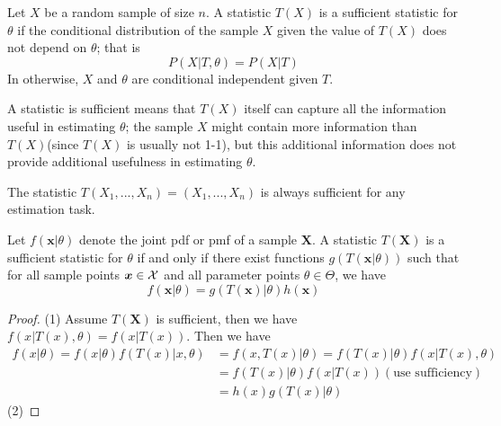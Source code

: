 \begin{refsection}
\begin{definition}
	Let $X$ be a random sample of size $n$. A statistic $T(X)$ is a sufficient statistic for $\theta$ if the conditional distribution of the sample $X$ given the value of $T(X)$ does not depend on $\theta$; that is
	$$P(X|T,\theta) = P(X|T)$$
	In otherwise, $X$ and $\theta$ are conditional independent given $T$.
\end{definition}



\begin{remark}
	A statistic is sufficient means that $T(X)$ itself can capture all the information useful in estimating $\theta$; the sample $X$ might contain more information than $T(X)$(since $T(X)$ is usually not 1-1), but this additional information does not provide additional usefulness in estimating $\theta$.
\end{remark}

\begin{remark}
	The statistic $T(X_1,...,X_n)=(X_1,...,X_n)$ is always sufficient for any estimation task.
\end{remark}


\begin{theorem}
	\cite[276]{casella2002statistical} Let $f(\bm{x}|\theta)$ denote the joint pdf or pmf of a sample $\bm{X}$. A statistic $T(\bm{X})$ is a sufficient statistic for $\theta$ if and only if there exist functions $g(T(\bm{x}|\theta))$ such that for all sample points $\bm{x}\in \mathcal{X}$ and all parameter points $\theta \in\Theta$, we have
	$$f(\bm{x}|\theta) = g(T(\bm{x})|\theta)h(\bm{x})$$
\end{theorem}
\begin{proof}
	(1) Assume $T(\bm{X})$ is sufficient, then we have $f(x|T(x),\theta) = f(x|T(x))$. Then we have
	\begin{align*}
	f(x|\theta) = f(x|\theta) f(T(x)|x,\theta) &= f(x,T(x)|\theta) = f(T(x)|\theta) f(x|T(x),\theta)\\
	&= f(T(x)|\theta)f(x|T(x)) (\text{use sufficiency})\\
	&=h(x) g(T(x)|\theta)
	\end{align*}
	(2)	
	

\end{proof}
\end{refsection}
